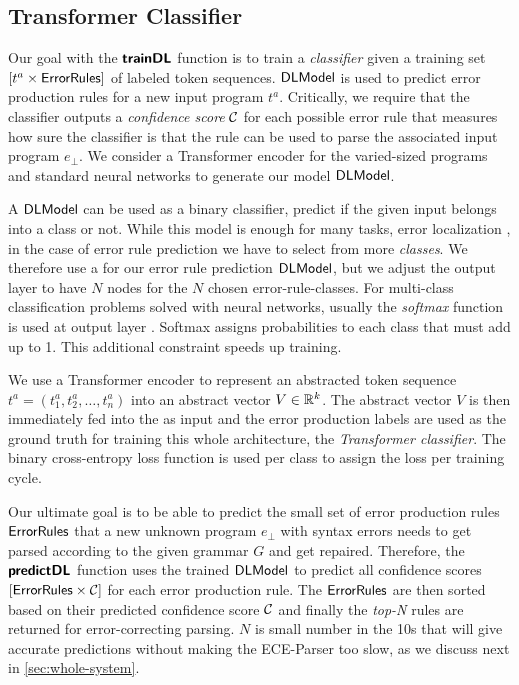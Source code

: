 \subsection{Transformer Classifier}
\label{sec:seq-classifiers:location-rank}

Our goal with the $\bm{\mathsf{trainDL}}$ function is to train a \emph{classifier} given a
training set $[t^a \times \mathsf{ErrorRules}]$ of labeled token sequences.
$\mathsf{DLModel}$ is used to predict error production rules for a new input program
$t^a$. Critically, we require that the classifier outputs a \emph{confidence
score} $\mathcal{C}$ for each possible error rule that measures how sure the
classifier is that the rule can be used to parse the associated input program
$e_{\bot}$. We consider a Transformer encoder for the varied-sized programs and
standard neural networks to generate our model $\mathsf{DLModel}$.

%
A \dnn $\mathsf{DLModel}$ can be used as a binary classifier, \ie predict if the given
input belongs into a class or not. While this model is enough for many tasks,
\eg error localization \citep{Sakkas_2020, Seidel:2017}, in the case of error
rule prediction we have to select from more \emph{classes}. We therefore use a
\dnn for our error rule prediction $\mathsf{DLModel}$, but we adjust the output layer to
have $N$ nodes for the $N$ chosen error-rule-classes. For multi-class
classification problems solved with neural networks, usually the \emph{softmax}
function is used at output layer \citep{Goodfellow-et-al-2016,
Bishop-book-2006}. Softmax assigns probabilities to each class that must add up
to 1. This additional constraint speeds up training.

%
We use a Transformer encoder to represent an abstracted token sequence $t^a =
(t^a_1, t^a_2, \dots, t^a_n)$ into an abstract vector $V \in \mathbb{R}^k$. The abstract
vector $V$ is then immediately fed into the \dnn as input and the error
production labels are used as the ground truth for training this whole
architecture, \ie the \emph{Transformer classifier}. The binary cross-entropy
loss function is used per class to assign the loss per training cycle.

%
Our ultimate goal is to be able to predict the small set of error production
rules $\mathsf{ErrorRules}$ that a new unknown program $e_\bot$ with syntax errors
needs to get parsed according to the given grammar $G$ and get repaired.
Therefore, the $\bm{\mathsf{predictDL}}$ function uses the trained $\mathsf{DLModel}$ to predict all
confidence scores $[\mathsf{ErrorRules} \times \mathcal{C}]$ for each error production
rule. The $\mathsf{ErrorRules}$ are then sorted based on their predicted confidence
score $\mathcal{C}$ and finally the \emph{top-N} rules are returned for
error-correcting parsing. $N$ is small number in the 10s that will give accurate
predictions without making the ECE-Parser too slow, as we discuss next in
\autoref{sec:whole-system}.

